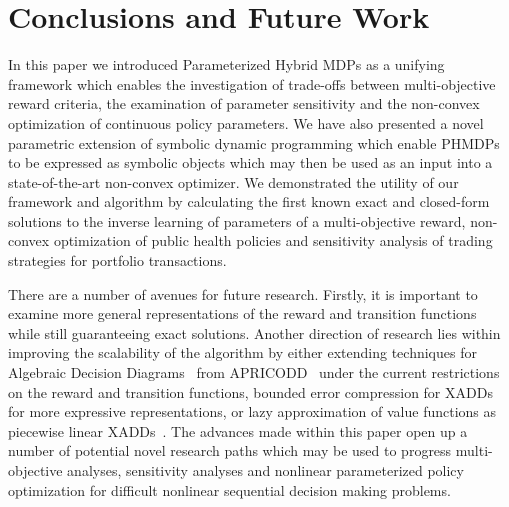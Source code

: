 \section{Conclusions and Future Work}
\label{sec:conclusion}

In this paper we introduced Parameterized Hybrid MDPs as a unifying framework which enables the investigation of trade-offs between multi-objective reward criteria, the examination of parameter sensitivity and the non-convex optimization of continuous policy parameters. We have also presented a novel parametric extension of symbolic dynamic programming which enable PHMDPs to be expressed as symbolic objects which may then be used as an input into a state-of-the-art non-convex optimizer. We demonstrated the utility of our framework and algorithm by calculating the first known exact and closed-form solutions to the inverse learning of parameters of a multi-objective reward, non-convex optimization of public health policies and sensitivity analysis of trading strategies for portfolio transactions.

There are a number of avenues for future research. Firstly, it is important to examine more general representations of the reward and transition functions while still guaranteeing exact solutions. Another direction of research lies within improving the scalability of the algorithm by either extending techniques for Algebraic Decision Diagrams~\parencite{Bahar_JoFMiSD_1993} from APRICODD~\parencite{St-Aubin_NIPS_2000} under the current restrictions on the reward and transition functions, bounded error compression for 
XADDs~\parencite{Vianna_UAI_2013} for more expressive representations, or lazy approximation of value functions as piecewise linear XADDs~\parencite{Li_AAAI_2005}. The advances made within this paper open up a number of potential novel research paths which may be used to progress multi-objective analyses, sensitivity analyses and nonlinear parameterized policy optimization for difficult nonlinear sequential decision making problems.

